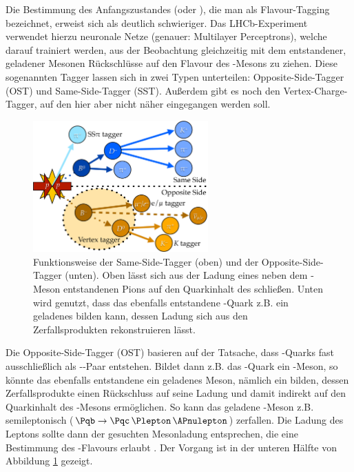 Die Bestimmung des Anfangszustandes (\PBz oder \PaBz), die man als Flavour-Tagging bezeichnet, erweist sich als deutlich schwieriger.
Das LHCb-Experiment verwendet hierzu neuronale Netze (genauer: Multilayer Perceptrons), welche darauf trainiert werden, aus der Beobachtung gleichzeitig mit dem \PBz entstandener, geladener Mesonen Rückschlüsse auf den Flavour des \PBz-Mesons zu ziehen.
Diese sogenannten Tagger lassen sich in zwei Typen unterteilen: Opposite-Side-Tagger (OST) und Same-Side-Tagger (SST).
Außerdem gibt es noch den Vertex-Charge-Tagger, auf den hier aber nicht näher eingegangen werden soll.

\begin{figure}
  \centering
  \includegraphics[width=0.6\textwidth]{figures/tagging.pdf}
  \caption{Funktionsweise der Same-Side-Tagger (oben) und der Opposite-Side-Tagger (unten). Oben lässt sich aus der Ladung eines neben dem \PB-Meson entstandenen Pions auf den Quarkinhalt des \PB schließen. Unten wird genutzt, dass das ebenfalls entstandene \Pqb-Quark z.B. ein geladenes \PBm bilden kann, dessen Ladung sich aus den Zerfallsprodukten rekonstruieren lässt. \cite{tobi-phd}}
  \label{tagging}
\end{figure}

Die Opposite-Side-Tagger (OST) basieren auf der Tatsache, dass \Pqb-Quarks fast ausschließlich als \Pqb-\Paqb-Paar entstehen. Bildet dann z.B. das \Pqb-Quark ein \PaBz-Meson, so könnte das ebenfalls entstandene \Paqb ein geladenes Meson, nämlich ein \PBp bilden, dessen Zerfallsprodukte einen Rückschluss auf seine Ladung und damit indirekt auf den Quarkinhalt des \PaBz-Mesons ermöglichen.
So kann das geladene \PB-Meson z.B. semileptonisch ($\Pqb \to \Pqc\,\Plepton \,\APnulepton$) zerfallen. Die Ladung des Leptons sollte dann der gesuchten Mesonladung entsprechen, die eine Bestimmung des \PB-Flavours erlaubt \cite{ost}.
Der Vorgang ist in der unteren Hälfte von Abbildung \ref{tagging} gezeigt.

